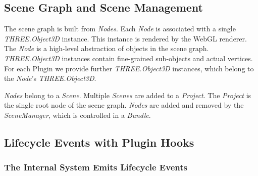\documentclass[../ClassicThesis.tex]{subfiles}
\begin{document}
\subsection{Scene Graph and Scene Management}

The scene graph is built from \emph{Nodes}. Each \emph{Node} is associated
with a single \emph{THREE.Object3D} instance. This instance is rendered by the
WebGL renderer. The \emph{Node} is a high-level abstraction of objects in the
scene graph. \emph{THREE.Object3D} instances contain fine-grained sub-objects and
actual vertices. For each Plugin we provide further \emph{THREE.Object3D}
instances, which belong to the \emph{Node}'s \emph{THREE.Object3D}.

\emph{Nodes} belong to a \emph{Scene}. Multiple \emph{Scenes}
are added to a \emph{Project}. The \emph{Project} is the single root node of the
scene graph. \emph{Nodes} are added and removed by the \emph{SceneManager},
which is controlled in a \emph{Bundle}.



\subsection{Lifecycle Events with Plugin Hooks}

\subsubsection{The Internal System Emits Lifecycle Events}
\end{document}
